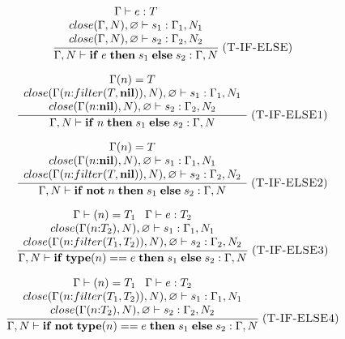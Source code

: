 \documentclass[12pt]{article}
\newcommand{\Nil}{\mathbf{nil}}
\newcommand{\kw}[1]{\mathbf{#1}}
\newcommand{\mylabel}[1]{\; (\textsc{#1})}
\newcommand{\env}{\Gamma}
\begin{document}
\[
\frac{\begin{array}{c}
      \env \vdash e:T\\
      close(\env, N), \varnothing \vdash s_{1} : \env_{1}, N_{1}\\
      close(\env, N), \varnothing \vdash s_{2} : \env_{2}, N_{2}
      \end{array}}
     {\env, N \vdash \kw{if} \; e \; \kw{then} \; s_{1} \; \kw{else} \; s_{2} : \env, N}
\mylabel{T-IF-ELSE}
\]

\[
\frac{\begin{array}{c}
      \env(n) = T\\
      close(\env(n{:}filter(T, \Nil)), N), \varnothing \vdash s_{1} : \env_{1}, N_{1}\\
      close(\env(n{:}\Nil), N), \varnothing \vdash s_{2} : \env_{2}, N_{2}
      \end{array}}
     {\env, N \vdash \kw{if} \; n \; \kw{then} \; s_{1} \; \kw{else} \; s_{2} : \env, N}
\mylabel{T-IF-ELSE1}
\]

\[
\frac{\begin{array}{c}
      \env(n) = T\\
      close(\env(n{:}\Nil), N), \varnothing \vdash s_{1} : \env_{1}, N_{1}\\
      close(\env(n{:}filter(T, \Nil)), N), \varnothing \vdash s_{2} : \env_{2}, N_{2}
      \end{array}}
     {\env, N \vdash \kw{if} \; \kw{not} \; n \; \kw{then} \; s_{1} \; \kw{else} \; s_{2} : \env, N}
\mylabel{T-IF-ELSE2}
\]

\[
\frac{\begin{array}{c}
      \env \vdash(n) = T_{1} \;\;\; \env \vdash e:T_{2}\\
      close(\env(n{:}T_{2}), N), \varnothing \vdash s_{1} : \env_{1}, N_{1}\\
      close(\env(n{:}filter(T_{1}, T_{2})), N), \varnothing \vdash s_{2} : \env_{2}, N_{2}
      \end{array}}
     {\env, N \vdash \kw{if} \; \kw{type}(n) == e \; \kw{then} \; s_{1} \; \kw{else} \; s_{2} : \env, N}
\mylabel{T-IF-ELSE3}
\]

\[
\frac{\begin{array}{c}
      \env \vdash(n) = T_{1} \;\;\; \env \vdash e:T_{2}\\
      close(\env(n{:}filter(T_{1}, T_{2})), N), \varnothing \vdash s_{1} : \env_{1}, N_{1}\\
      close(\env(n{:}T_{2}), N), \varnothing \vdash s_{2} : \env_{2}, N_{2}
      \end{array}}
     {\env, N \vdash \kw{if} \; \kw{not} \; \kw{type}(n) == e \; \kw{then} \; s_{1} \; \kw{else} \; s_{2} : \env, N}
\mylabel{T-IF-ELSE4}
\]
\end{document}
